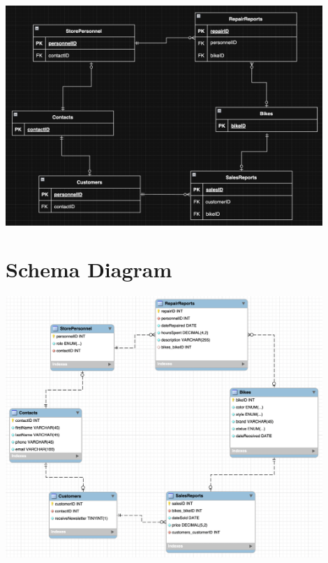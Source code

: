 \documentclass{article}
\begin{document}
\begin{tcolorbox}[colback=secondarycolor, colframe=primarycolor, arc=5mm]

\begin{center}
\vspace{0.5cm}
 \includegraphics[width=0.9\textwidth]{ERD.png}
\end{center}
\end{tcolorbox}

\vspace{0.5cm}

\section{Schema Diagram}

\begin{tcolorbox}[colback=secondarycolor, colframe=primarycolor, arc=5mm]

\begin{center}
\vspace{0.5cm}
 \includegraphics[width=0.9\textwidth]{Schema.png}
\end{center}
\end{tcolorbox}
\end{document}
